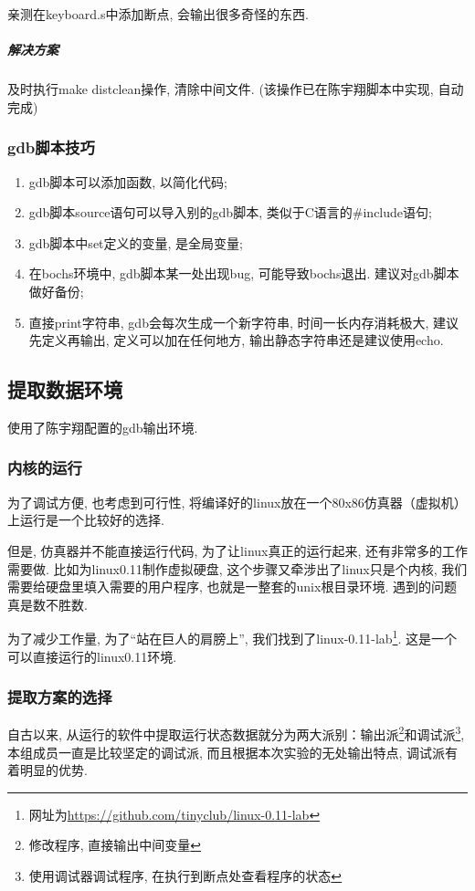 \documentclass{ctexart}
\begin{document}
亲测在keyboard.s中添加断点, 会输出很多奇怪的东西.
\subparagraph{解决方案}
及时执行make distclean操作, 清除中间文件. (该操作已在陈宇翔脚本中实现, 自动完成)

\subsubsection{gdb脚本技巧}
\begin{enumerate}
	\item gdb脚本可以添加函数, 以简化代码;
	\item gdb脚本source语句可以导入别的gdb脚本, 类似于C语言的\#include语句;
	\item gdb脚本中set定义的变量, 是全局变量;
	\item 在bochs环境中, gdb脚本某一处出现bug, 可能导致bochs退出. 建议对gdb脚本做好备份;
	\item 直接print字符串, gdb会每次生成一个新字符串, 时间一长内存消耗极大, 建议先定义再输出, 定义可以加在任何地方, 输出静态字符串还是建议使用echo.
\end{enumerate}

\subsection{提取数据环境}
使用了陈宇翔配置的gdb输出环境.

\subsubsection{内核的运行}

为了调试方便, 也考虑到可行性, 将编译好的linux放在一个80x86仿真器（虚拟机）上运行是一个比较好的选择.

但是, 仿真器并不能直接运行代码, 为了让linux真正的运行起来, 还有非常多的工作需要做. 比如为linux0.11制作虚拟硬盘, 这个步骤又牵涉出了linux只是个内核, 我们需要给硬盘里填入需要的用户程序, 也就是一整套的unix根目录环境. 遇到的问题真是数不胜数.

为了减少工作量, 为了“站在巨人的肩膀上”, 我们找到了linux-0.11-lab\footnote{网址为\url{https://github.com/tinyclub/linux-0.11-lab}}. 这是一个可以直接运行的linux0.11环境.

\subsubsection{提取方案的选择}

自古以来, 从运行的软件中提取运行状态数据就分为两大派别：输出派\footnote{修改程序, 直接输出中间变量}和调试派\footnote{使用调试器调试程序, 在执行到断点处查看程序的状态}, 本组成员一直是比较坚定的调试派, 而且根据本次实验的无处输出特点, 调试派有着明显的优势. 
\end{document}
